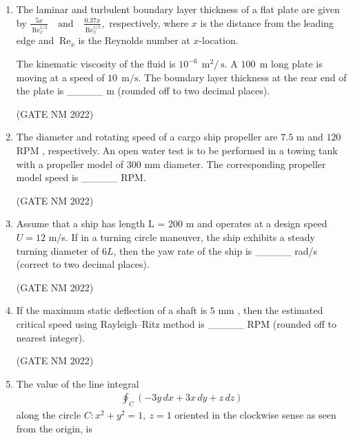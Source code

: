 \documentclass[journal,12pt,onecolumn]{IEEEtran}
\theoremstyle{remark}
\begin{document}
\begin{enumerate}
\item  The laminar and turbulent boundary layer thickness of a flat plate are given by  
$
\frac{5x}{\ \text{Re}_x^{1/2}}
\quad \text{and} \quad
\frac{0.37x}{\ \text{Re}_x^{1/5}},
$
respectively, where $x$ is the distance from the leading edge and $\ \text{Re}_x$ is the Reynolds number at $x$-location.  

The kinematic viscosity of the fluid is $10^{-6}~\ \text{m}^2/\ \text{s}$.  
A $100~\ \text{m}$  long plate is moving at a speed of $10~\ \text{m/s}$.  
The boundary layer thickness at the rear end of the plate is \_\_\_\_\_ m (rounded off to two decimal places).

\hfill(GATE NM 2022)






\item  The diameter and rotating speed of a cargo ship propeller are $7.5$ m  and $120$ RPM , respectively.  
An open water test is to be performed in a towing tank with a propeller model of 300 mm  diameter.  
The corresponding propeller model speed is \_\_\_\_\_ RPM.

\hfill(GATE NM 2022)
















\item  Assume that a ship has length L = 200 m  and operates at a design speed $U = 12$ m/s.  
If in a turning circle maneuver, the ship exhibits a steady turning diameter of $6L$, then the yaw rate of the ship is \_\_\_\_\_ rad/s (correct to two decimal places).

\hfill(GATE NM 2022)









\item  If the maximum static deflection of a shaft is $5$ mm , then the estimated critical speed using Rayleigh--Ritz method is \_\_\_\_\_ RPM  (rounded off to nearest integer).

	\hfill(GATE NM 2022)


\item  The value of the line integral  
\begin{align*}
\oint_C \!\left( -3y \, dx + 3x \, dy + z \, dz \right)
\end{align*}
along the circle $C: x^2 + y^2 = 1, \ z = 1$ oriented in the clockwise sense as seen from the origin, is


\end{enumerate}
\end{document}
